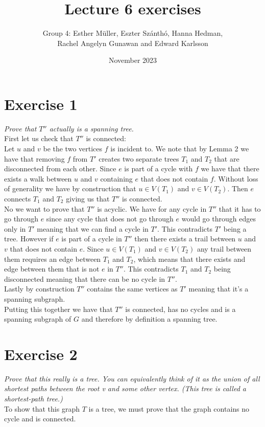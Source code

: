 \documentclass{article}
\title{Lecture 6 exercises}
\author{Group 4: Esther Müller, Eszter Szánthó, Hanna Hedman,\\ Rachel Angelyn Gunawan and Edward Karlsson}
\date{November 2023}
\begin{document}
\maketitle
\section*{Exercise 1}
 \emph{Prove that $T''$ actually is a spanning tree.}\\
 
First let us check that $T''$ is connected:\\
Let $u$ and $v$ be the two vertices $f$ is incident to. We note that by Lemma 2 we have that removing $f$ from $T'$ creates two separate trees $T_1$ and $T_2$ that are disconnected from each other. Since $e$ is part of a cycle with $f$ we have that there exists a walk between $u$ and $v$ containing $e$ that does not contain $f$. Without loss of generality we have by construction that $u \in V(T_1)$ and $v \in V(T_2)$. Then $e$ connects $T_1$ and $T_2$ giving us that $T''$ is connected.\\
No we want to prove that $T''$ is acyclic. We have for any cycle in $T''$ that it has to go through $e$ since any cycle that does not go through $e$ would go through edges only in $T'$ meaning that we can find a cycle in $T'$. This contradicts $T'$ being a tree. However if $e$ is part of a cycle in $T''$ then there exists a trail between $u$ and $v$ that does not contain $e$. Since $u \in V(T_1)$ and $v \in V(T_2)$ any trail between them requires an edge between $T_1$ and $T_2$, which means that there exists and edge between them that is not $e$ in $T''$. This contradicts $T_1$ and $T_2$ being disconnected meaning that there can be no cycle in $T''$.\\
Lastly by construction $T''$ contains the same vertices as $T'$ meaning that it's a spanning subgraph.\\
Putting this together we have that $T''$ is connected, has no cycles and is a spanning subgraph of $G$ and therefore by definition a spanning tree.
\section*{Exercise 2}
\emph{Prove that this really is a
tree. You can equivalently think of it as
the union of all shortest paths between
the root v and some other vertex. (This
tree is called a shortest-path tree.)}\\

To show that this graph $T$ is a tree, we must prove that the graph contains no cycle and is connected. \\
\end{document}
